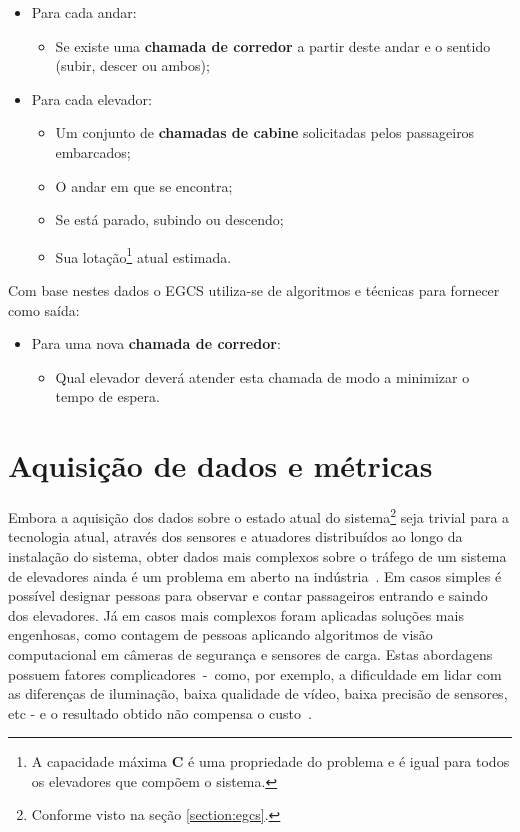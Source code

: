 \begin{itemize}
  \item Para cada andar:
  \begin{itemize}
    \item Se existe uma \textbf{chamada de corredor} a partir deste andar e o
          sentido (subir, descer ou ambos);
  \end{itemize}
  \item Para cada elevador:
  \begin{itemize}
    \item Um conjunto de \textbf{chamadas de cabine} solicitadas pelos
          passageiros embarcados;
    \item O andar em que se encontra;
    \item Se está parado, subindo ou descendo;
    \item Sua lotação\footnote{A capacidade máxima \textbf{C} é uma
          propriedade do problema e é igual para todos os elevadores que compõem
          o sistema.} atual estimada.
  \end{itemize}
\end{itemize}

Com base nestes dados o EGCS utiliza-se de algoritmos e técnicas para fornecer
como saída:

\begin{itemize}
  \item Para uma nova \textbf{chamada de corredor}:
  \begin{itemize}
    \item Qual elevador deverá atender esta chamada de modo a minimizar o tempo de espera.
  \end{itemize}
\end{itemize}

\section{\label{section:data}Aquisição de dados e métricas}

Embora a aquisição dos dados sobre o estado atual do sistema\footnote{Conforme
visto na seção \ref{section:egcs}.} seja trivial para a tecnologia atual,
através dos sensores e atuadores distribuídos ao longo da instalação do sistema,
obter dados mais complexos sobre o tráfego de um sistema de elevadores ainda é
um problema em aberto na indústria~\cite{KOEHLEROTTIGER02}. Em casos simples é
possível designar pessoas para observar e contar passageiros entrando e saindo
dos elevadores. Já em casos mais complexos foram aplicadas soluções mais
engenhosas, como contagem de pessoas aplicando algoritmos de visão computacional
em câmeras de segurança e sensores de carga. Estas abordagens possuem fatores
complicadores~-~como, por exemplo, a dificuldade em lidar com as diferenças de
iluminação, baixa qualidade de vídeo, baixa precisão de sensores, etc - e o
resultado obtido não compensa o custo~\cite{KOEHLEROTTIGER02}.

